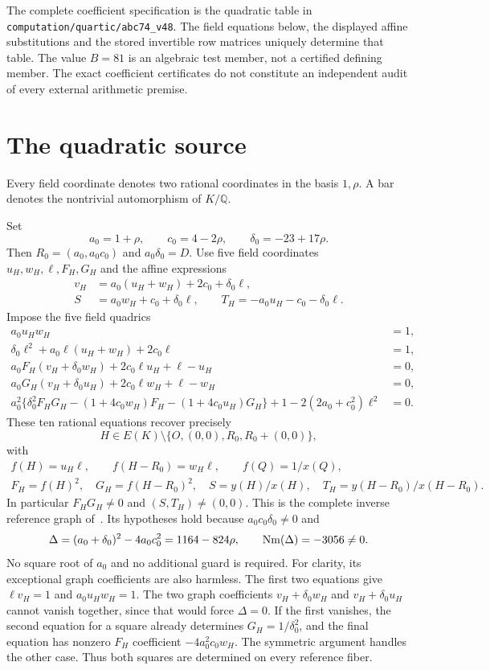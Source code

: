 \documentclass[11pt,a4paper]{article}
\newcommand{\Q}{\mathbb Q}\newcommand{\Z}{\mathbb Z}
\begin{document}
The complete coefficient specification is the quadratic table in
\nolinkurl{computation/quartic/abc74_v48}. The field equations below,
the displayed affine substitutions and the stored invertible row
matrices uniquely determine that table. The value $B=81$ is an
algebraic test member, not a certified defining member. The exact
coefficient certificates do not constitute an independent audit of
every external arithmetic premise.

\section{The quadratic source}
Every field coordinate denotes two rational coordinates in the basis
$1,\rho$. A bar denotes the nontrivial automorphism of $K/\Q$.

Set
\[
 a_0=1+\rho,\qquad c_0=4-2\rho,\qquad
 \delta_0=-23+17\rho.
\]
Then $R_0=(a_0,a_0c_0)$ and $a_0\delta_0=D$.
Use five field coordinates $u_H,w_H,\ell,F_H,G_H$ and the affine
expressions
\[
 \begin{split}
 v_H&=a_0(u_H+w_H)+2c_0+\delta_0\ell,\\
 S&=a_0w_H+c_0+\delta_0\ell,\qquad
 T_H=-a_0u_H-c_0-\delta_0\ell.
 \end{split}
\]
Impose the five field quadrics
\begin{equation}\label{eq:reference}
\begin{aligned}
 a_0u_Hw_H&=1,\\
 \delta_0\ell^2+a_0\ell(u_H+w_H)+2c_0\ell&=1,\\
 a_0F_H(v_H+\delta_0w_H)+2c_0\ell u_H+\ell-u_H&=0,\\
 a_0G_H(v_H+\delta_0u_H)+2c_0\ell w_H+\ell-w_H&=0,\\
 a_0^2\{\delta_0^2F_HG_H-(1+4c_0w_H)F_H
                  -(1+4c_0u_H)G_H\}
       +1-2(2a_0+c_0^2)\ell^2&=0.
\end{aligned}
\end{equation}
These ten rational equations recover precisely
\[
 H\in E(K)\setminus\{O,(0,0),R_0,R_0+(0,0)\},
\]
with
\[
 \begin{gathered}
 f(H)=u_H\ell,\qquad f(H-R_0)=w_H\ell,\qquad f(Q)=1/x(Q),\\
 F_H=f(H)^2,\quad G_H=f(H-R_0)^2,\quad
 S=y(H)/x(H),\quad T_H=y(H-R_0)/x(H-R_0).
 \end{gathered}
\]
In particular $F_HG_H\ne0$ and $(S,T_H)\ne(0,0)$.
This is the complete inverse reference graph of~\cite[Theorem~2.1]{Reference}.
Its hypotheses hold because $a_0c_0\delta_0\ne0$ and
\[
 \Delta=(a_0+\delta_0)^2-4a_0c_0^2=1164-824\rho,
 \qquad \operatorname{Nm}(\Delta)=-3056\ne0.
\]
No square root of $a_0$ and no additional guard is required.
For clarity, its exceptional graph coefficients are also harmless.
The first two equations give $\ell v_H=1$ and $a_0u_Hw_H=1$.
The two graph coefficients $v_H+\delta_0w_H$ and
$v_H+\delta_0u_H$ cannot vanish together, since that would force
$\Delta=0$. If the first vanishes, the second equation for a square
already determines $G_H=1/\delta_0^2$, and the final equation has
nonzero $F_H$ coefficient $-4a_0^2c_0w_H$. The symmetric argument
handles the other case. Thus both squares are determined on every
reference fiber.
\end{document}
